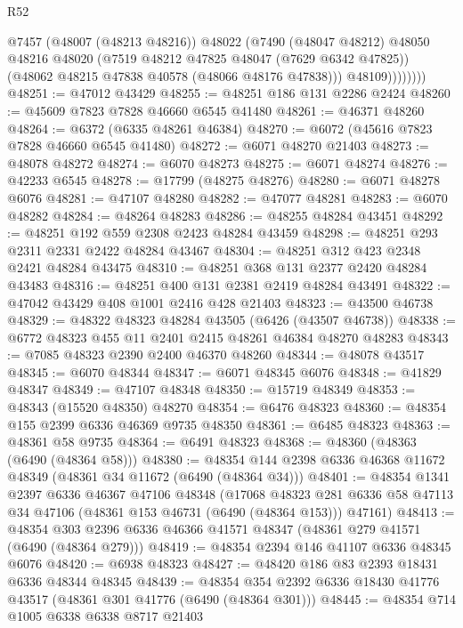 \begin{lexlean}{R52}
\begin{coremodule}
                  @7457
                    (@48007 (@48213 @48216))
                    @48022
                    (@7490
                      (@48047 @48212)
                      @48050
                      @48216
                      @48020
                      (@7519 @48212 @47825 @48047 (@7629 @6342 @47825))
                      (@48062 @48215 @47838 @40578 (@48066 @48176 @47838)))
                    @48109))))))))
@48251 := @47012 @43429
@48255 := @48251 @186 @131 @2286 @2424
@48260 := @45609 @7823 @7828 @46660 @6545 @41480
@48261 := @46371 @48260
@48264 := @6372 (@6335 @48261 @46384)
@48270 := @6072 (@45616 @7823 @7828 @46660 @6545 @41480)
@48272 := @6071 @48270 @21403
@48273 := @48078 @48272
@48274 := @6070 @48273
@48275 := @6071 @48274
@48276 := @42233 @6545
@48278 := @17799 (@48275 @48276)
@48280 := @6071 @48278 @6076
@48281 := @47107 @48280
@48282 := @47077 @48281
@48283 := @6070 @48282
@48284 := @48264 @48283
@48286 := @48255 @48284 @43451
@48292 := @48251 @192 @559 @2308 @2423 @48284 @43459
@48298 := @48251 @293 @2311 @2331 @2422 @48284 @43467
@48304 := @48251 @312 @423 @2348 @2421 @48284 @43475
@48310 := @48251 @368 @131 @2377 @2420 @48284 @43483
@48316 := @48251 @400 @131 @2381 @2419 @48284 @43491
@48322 := @47042 @43429 @408 @1001 @2416 @428 @21403
@48323 := @43500 @46738
@48329 := @48322 @48323 @48284 @43505 (@6426 (@43507 @46738))
@48338 := @6772 @48323 @455 @11 @2401 @2415 @48261 @46384 @48270 @48283
@48343 := @7085 @48323 @2390 @2400 @46370 @48260
@48344 := @48078 @43517
@48345 := @6070 @48344
@48347 := @6071 @48345 @6076
@48348 := @41829 @48347
@48349 := @47107 @48348
@48350 := @15719 @48349
@48353 := @48343 (@15520 @48350) @48270
@48354 := @6476 @48323
@48360 := @48354 @155 @2399 @6336 @46369 @9735 @48350
@48361 := @6485 @48323
@48363 := @48361 @58 @9735
@48364 := @6491 @48323
@48368 := @48360 (@48363 (@6490 (@48364 @58)))
@48380 := @48354 @144 @2398 @6336 @46368 @11672 @48349 (@48361 @34 @11672 (@6490 (@48364 @34)))
@48401 := @48354
    @1341
    @2397
    @6336
    @46367
    @47106
    @48348
    (@17068
      @48323
      @281
      @6336
      @58
      @47113
      @34
      @47106
      (@48361 @153 @46731 (@6490 (@48364 @153)))
      @47161)
@48413 := @48354 @303 @2396 @6336 @46366 @41571 @48347 (@48361 @279 @41571 (@6490 (@48364 @279)))
@48419 := @48354 @2394 @146 @41107 @6336 @48345 @6076
@48420 := @6938 @48323
@48427 := @48420 @186 @83 @2393 @18431 @6336 @48344 @48345
@48439 := @48354 @354 @2392 @6336 @18430 @41776 @43517 (@48361 @301 @41776 (@6490 (@48364 @301)))
@48445 := @48354 @714 @1005 @6338 @6338 @8717 @21403

\end{coremodule}
\end{lexlean}
